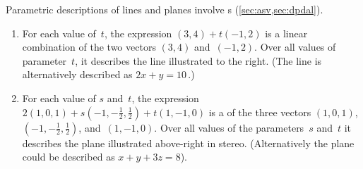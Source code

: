 \begin{example} \label{eg:lcs}
Parametric descriptions of lines and planes  involve s (\cref{sec:asv,sec:dpdal}).
\begin{enumerate}
\item 
\begin{figbox}{}%
For each value of~\(t\), the expression \((3,4)+t(-1,2)\) is a linear combination of the two vectors \((3,4)\) and~\((-1,2)\).  
Over all values of parameter~\(t\), it describes the line illustrated to the right.
(The line is alternatively described as \(2x+y=10\)\,.)
\vspace{2\baselineskip}
\end{figbox}


\item 
\begin{figbox}{ {}}%
For each value of \(s\) and~\(t\), the expression \(2(1,0,1)+s(-1,-\frac12,\frac12)+t(1,-1,0)\) is a  of the three vectors \((1,0,1)\), \((-1,-\frac12,\frac12)\), and~\((1,-1,0)\).
Over all values of the parameters~\(s\) and~\(t\) it describes the plane illustrated above-right in stereo.
(Alternatively the plane could be described as \(x+y+3z=8\)).
\end{figbox}



\end{enumerate}
\end{example}
